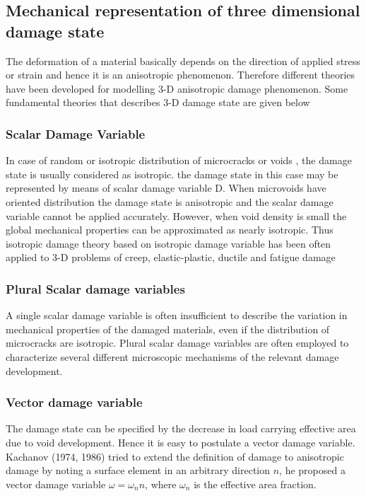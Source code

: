 \documentclass[a4paper,12pt]{extarticle}
\begin{document}
\subsection{Mechanical representation of three dimensional damage state}
\indent\indent\indent The deformation of a material basically depends on the direction of applied stress or strain and hence it is an anisotropic phenomenon. Therefore different theories have been developed for modelling 3-D anisotropic damage phenomenon. Some fundamental theories that describes 3-D damage state are given below 
\subsubsection{Scalar Damage Variable}
\indent\indent\indent In case of random or isotropic distribution of microcracks or voids , the damage state is usually considered as isotropic. the damage state in this case may be represented by means of scalar damage variable D. When microvoids  have oriented distribution the damage state is anisotropic and the scalar damage variable cannot be applied accurately. However, when void density is small the global mechanical properties can be approximated as nearly isotropic. Thus isotropic damage theory based on isotropic damage variable has been often applied to 3-D problems of creep, elastic-plastic, ductile and fatigue damage
\subsubsection{Plural Scalar damage variables}
\indent\indent\indent A single scalar damage variable is often insufficient to describe the variation in mechanical properties of the damaged materials, even if the distribution of microcracks are isotropic. Plural scalar damage variables are often employed to characterize several different microscopic mechanisms of the relevant damage development.
\subsubsection{Vector damage variable}
\indent\indent\indent The damage state can be specified by the decrease in load carrying effective area due to void development. Hence it is easy to postulate a vector damage variable. Kachanov (1974, 1986) tried to extend the definition of damage to anisotropic damage by noting a surface element in an arbitrary direction $n$, he proposed a vector damage variable $ \omega = \omega_{n}n$, where $\omega_{n}$ is the effective area fraction. 
\end{document}
